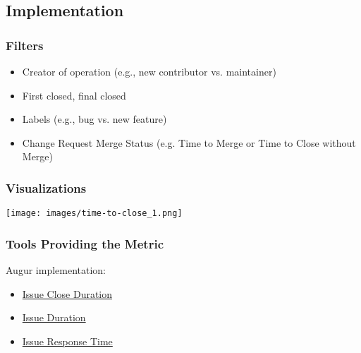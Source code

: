 \documentclass[
  12pt,
]{article}
\providecommand{\tightlist}{%
  \setlength{\itemsep}{0pt}\setlength{\parskip}{0pt}}
\begin{document}
\hypertarget{implementation-5}{%
\subsection{Implementation}\label{implementation-5}}

\hypertarget{filters-3}{%
\subsubsection{Filters}\label{filters-3}}

\begin{itemize}
\tightlist
\item
  Creator of operation (e.g., new contributor vs. maintainer)\\
\item
  First closed, final closed\\
\item
  Labels (e.g., bug vs. new feature)
\item
  Change Request Merge Status (e.g. Time to Merge or Time to Close
  without Merge)
\end{itemize}

\hypertarget{visualizations-4}{%
\subsubsection{Visualizations}\label{visualizations-4}}

\texttt{[image: images/time-to-close\_1.png]}

\hypertarget{tools-providing-the-metric-3}{%
\subsubsection{Tools Providing the
Metric}\label{tools-providing-the-metric-3}}

Augur implementation:

\begin{itemize}
\tightlist
\item
  \href{http://augur.osshealth.io/api_docs/\#api-Evolution-Closed_Issue_Resolution_Duration(Repo)}{Issue
  Close Duration}\\
\item
  \href{http://augur.osshealth.io/api_docs/\#api-Evolution-issue-duration-repo}{Issue
  Duration}\\
\item
  \href{http://augur.osshealth.io/api_docs/\#api-Evolution-Issue_Response_Time(Repo)}{Issue
  Response Time}
\end{itemize}
\end{document}
